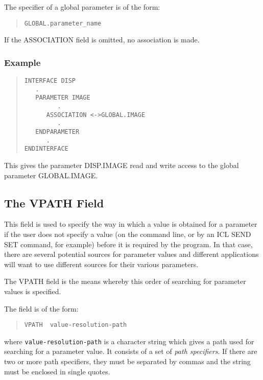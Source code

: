 \documentclass[twoside,11pt]{article}
\newcommand{\xlabel}[1]{}
\renewcommand{\_}{\texttt{\symbol{95}}}
\begin{document}
The specifier of a global parameter is of the form:
\begin{quote} \begin{verbatim}
GLOBAL.parameter_name
\end{verbatim} \end{quote}
If the ASSOCIATION field is omitted, no association is made.

\subsubsection*{Example}
\begin{quote} \begin{verbatim}
INTERFACE DISP
   .
   PARAMETER IMAGE
         .
      ASSOCIATION <->GLOBAL.IMAGE
         .
   ENDPARAMETER
      .
ENDINTERFACE
\end{verbatim} \end{quote}
This gives the parameter DISP.IMAGE read and write access to the global
parameter GLOBAL.\-IMAGE.

\subsection{The VPATH Field
\xlabel{the_vpath_field}\label{vpath}}

This field is used to specify the way in which a value is obtained for
a parameter if the user does not specify a value (on the command line, or by
an ICL SEND SET command, for example) before it is required by the program.
In that case, there are several potential sources for parameter values and
different applications will want to use different sources for their various
parameters.

The VPATH field is the means whereby this
order of searching for parameter values is specified.

The field is of the form:
\begin{quote} \begin{verbatim}
VPATH  value-resolution-path
\end{verbatim} \end{quote}
where \texttt{value-resolution-path} is a character string which gives a path
used for searching for a parameter value.
It consists of a set of {\em path specifiers}. If there are two or more
path specifiers, they must be separated by commas and the string must be
enclosed in single quotes.
\end{document}

